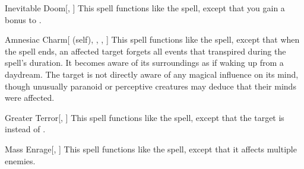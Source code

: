 \lowercase{\hypertarget{spell:Inevitable Doom}{}}\label{spell:Inevitable Doom}
\begin{freeability}[Rank 5]{\hypertarget{spell:Inevitable Doom}{Inevitable Doom}}[, ]
This spell functions like the  spell, except that you gain a  bonus to .
\end{freeability}
\vspace{0.25em}



\lowercase{\hypertarget{spell:Amnesiac Charm}{}}\label{spell:Amnesiac Charm}
\begin{attuneability}[Rank 6]{\hypertarget{spell:Amnesiac Charm}{Amnesiac Charm}}[ (self), , , ]
This spell functions like the  spell, except that when the spell ends, an affected target forgets all events that transpired during the spell's duration.
It becomes aware of its surroundings as if waking up from a daydream.
The target is not directly aware of any magical influence on its mind, though unusually paranoid or perceptive creatures may deduce that their minds were affected.
\end{attuneability}
\vspace{0.25em}



\lowercase{\hypertarget{spell:Greater Terror}{}}\label{spell:Greater Terror}
\begin{freeability}[Rank 6]{\hypertarget{spell:Greater Terror}{Greater Terror}}[, ]
This spell functions like the  spell, except that the target is  instead of .
\end{freeability}
\vspace{0.25em}



\lowercase{\hypertarget{spell:Mass Enrage}{}}\label{spell:Mass Enrage}
\begin{freeability}[Rank 6]{\hypertarget{spell:Mass Enrage}{Mass Enrage}}[, ]
This spell functions like the  spell, except that it affects multiple enemies.
\end{freeability}
\vspace{0.25em}



